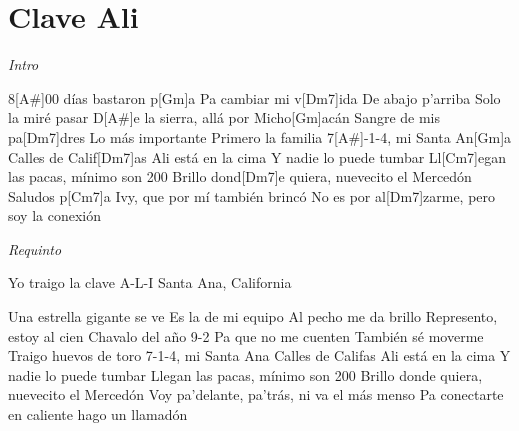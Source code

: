\section{Clave Ali}
\noindent

\vspace{1cm}

\begin{guitar}
	\begin{multicols}{2}
		\textit{Intro}
		\par

		8[A#]00 días bastaron p[Gm]a
		Pa cambiar mi v[Dm7]ida
		De abajo p'arriba
		Solo la miré pasar
		D[A#]e la sierra, allá por Micho[Gm]acán
		Sangre de mis pa[Dm7]dres
		Lo más importante
		Primero la familia
		7[A#]-1-4, mi Santa An[Gm]a
		Calles de Calif[Dm7]as
		Ali está en la cima
		Y nadie lo puede tumbar
		Ll[Cm7]egan las pacas, mínimo son 200
		Brillo dond[Dm7]e quiera, nuevecito el Mercedón
		Saludos p[Cm7]a Ivy, que por mí también brincó
		No es por al[Dm7]zarme, pero soy la conexión
		\par
		\textit{Requinto}
		\par

		Yo traigo la clave A-L-I
		Santa Ana, California
		\par
		Una estrella gigante se ve
		Es la de mi equipo
		Al pecho me da brillo
		Represento, estoy al cien
		Chavalo del año 9-2
		Pa que no me cuenten
		También sé moverme
		Traigo huevos de toro
		7-1-4, mi Santa Ana
		Calles de Califas
		Ali está en la cima
		Y nadie lo puede tumbar
		Llegan las pacas, mínimo son 200
		Brillo donde quiera, nuevecito el Mercedón
		Voy pa'delante, pa'trás, ni va el más menso
		Pa conectarte en caliente hago un llamadón

	\end{multicols}
\end{guitar}

